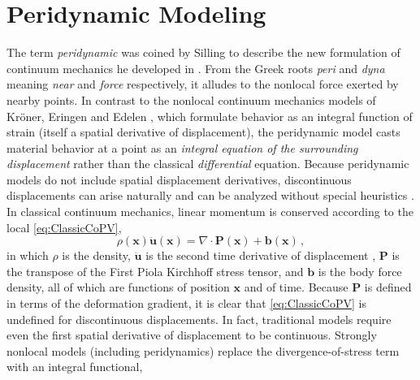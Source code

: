\section{Peridynamic Modeling}
The term \textit{peridynamic} was coined by Silling to describe the new formulation of continuum mechanics he developed in \cite{silling2000reformulation}.
From the Greek roots \textit{peri} and \textit{dyna} meaning \textit{near} and \textit{force} respectively, it alludes to the nonlocal force exerted by nearby points.
In contrast to the nonlocal continuum mechanics models of Kr\"oner, Eringen and Edelen \cite{kroner1967elasticity,eringen1972nonlocal,eringen1983differential}, which formulate behavior as an integral function of strain (itself a spatial derivative of displacement), the peridynamic model casts material behavior at a point as an \textit{integral equation of the surrounding displacement} rather than the classical \textit{differential} equation.
Because peridynamic models do not include spatial displacement derivatives, discontinuous displacements can arise naturally and can be analyzed without special heuristics . 
In classical continuum mechanics, linear momentum is conserved according to the local  \cref{eq:ClassicCoPV},
%
\begin{equation}
\label{eq:ClassicCoPV}
\rho(\mathbf{x})\ddot{\mathbf{u}}(\mathbf{x}) = \nabla \cdot \mathbf{P}(\mathbf{x}) + \mathbf{b}(\mathbf{x})\, ,
\end{equation}
%
in which $\rho$ is the density, $\ddot{\mathbf{u}}$ is the second time derivative of displacement , $\mathbf{P}$ is the transpose of the First Piola Kirchhoff stress tensor, and $\mathbf{b}$ is the body force density, all of which are functions of position $\mathbf{x}$ and of time. 
Because \(\mathbf{P}\) is defined in terms of the deformation gradient, it is clear that \cref{eq:ClassicCoPV} is undefined for discontinuous displacements. 
In fact, traditional models require even the first spatial derivative of displacement to be continuous.
Strongly nonlocal models (including peridynamics) replace the divergence-of-stress term with an integral functional,
